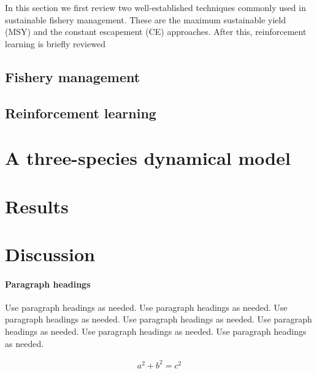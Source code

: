 \documentclass[smallextended]{svjour3}       %
\begin{document}
In this section we first review two well-established techniques commonly used in sustainable fishery management. 
These are the maximum sustainable yield (MSY) and the constant escapement (CE) approaches. 
After this, reinforcement learning is briefly reviewed

\hypertarget{sec:2}{%
\subsection{Fishery management}\label{sec:fishery}}

\hypertarget{sec:3}{%
\subsection{Reinforcement learning}\label{sec:rl}}

\hypertarget{sec:4}{%
\section{A three-species dynamical model}\label{sec:model}}

\hypertarget{sec:5}{%
\section{Results}\label{sec:results}}

\hypertarget{sec:6}{%
\section{Discussion}\label{sec:discussion}}




\hypertarget{paragraph-headings}{%
\paragraph{Paragraph headings}\label{paragraph-headings}}

Use paragraph headings as needed. 
Use paragraph headings as needed. 
Use paragraph headings as needed. 
Use paragraph headings as needed. 
Use paragraph headings as needed. 
Use paragraph headings as needed. 
Use paragraph headings as needed. 

\begin{align}
a^2+b^2=c^2
\end{align}




\end{document}

